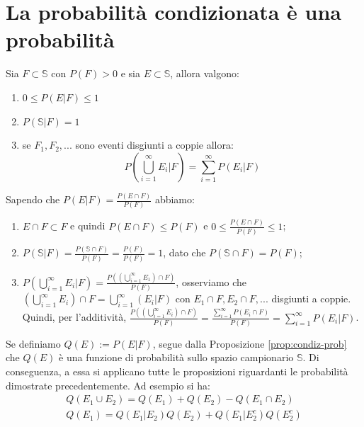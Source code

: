 \section{La probabilità condizionata è una probabilità}
\begin{Proposition}{}{}\label{prop:condiz-prob}
    Sia $F\subset\mathbb{S}$ con $P(F)>0$ e sia $E\subset\mathbb{S}$, allora valgono:
    \begin{enumerate}
        \item $0\leq P(E|F)\leq1$
        \item $P(\mathbb{S}|F)=1$
        \item se $F_1,F_2,...$ sono eventi disgiunti a coppie allora:
        \begin{equation*}
            P(\bigcup^\infty_{i=1}E_i|F)=\sum^\infty_{i=1}P(E_i|F)
        \end{equation*}
    \end{enumerate}
    \begin{demonstration}
        Sapendo che $P(E|F)=\frac{P(E\cap F)}{P(F)}$ abbiamo:
        \begin{enumerate}
            \item $E\cap F\subset F$ e quindi $P(E\cap F)\leq P(F)$ e $0\leq \frac{P(E\cap F)}{P(F)}\leq1$;
            \item $P(\mathbb{S}|F)=\frac{P(\mathbb{S}\cap F)}{P(F)}=\frac{P(F)}{P(F)}=1$, dato che $P(\mathbb{S}\cap F)=P(F)$;
            \item $P(\bigcup^\infty_{i=1}E_i|F)=\frac{P((\bigcup^\infty_{i=1} E_1)\cap F)}{P(F)}$, osserviamo che $(\bigcup^\infty_{i=1} E_i)\cap F=\bigcup^\infty_{i=1}(E_i|F)$ con $E_1\cap F, E_2\cap F,...$ disgiunti a coppie. Quindi, per l'additività, $\frac{P((\bigcup^\infty_{i=1}E_i)\cap F)}{P(F)}=\frac{\sum_{i=1}^\infty P(E_i\cap F)}{P(F)}=\sum_{i=1}^\infty P(E_i|F)$.
        \end{enumerate}
    \end{demonstration}
\end{Proposition}

Se definiamo $Q(E):=P(E|F)$, segue dalla Proposizione \ref{prop:condiz-prob} che $Q(E)$ è una funzione di probabilità sullo spazio campionario $\mathbb{S}$. Di conseguenza, a essa si applicano tutte le proposizioni riguardanti le probabilità dimostrate precedentemente. Ad esempio si ha:
\begin{gather*}
    Q(E_1\cup E_2)=Q(E_1)+Q(E_2)-Q(E_1\cap E_2)\\
    Q(E_1)=Q(E_1|E_2)Q(E_2)+Q(E_1|E_2^c)Q(E_2^c)
\end{gather*}

